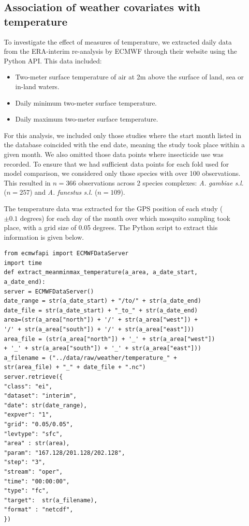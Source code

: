\documentclass[12pt]{article}
\begin{document}
{\subsection{Association of weather covariates with temperature}
To investigate the effect of measures of temperature, we extracted daily data from the ERA-interim re-analysis by ECMWF \citep{dee2011era} through their website using the Python API. This data included: 

\begin{itemize}
	\item Two-meter surface temperature of air at 2m above the surface of land, sea or in-land waters.
	\item Daily minimum two-meter surface temperature.
	\item Daily maximum two-meter surface temperature.
\end{itemize}

For this analysis, we included only those studies where the start month listed in the database coincided with the end date, meaning the study took place within a given month. We also omitted those data points where insecticide use was recorded. To ensure that we had sufficient data points for each fold used for model comparison, we considered only those species with over 100 observations. This resulted in $n=366$ observations across 2 species complexes: \textit{A. gambiae s.l.} ($n=257$) and \textit{A. funestus s.l.} ($n=109$).

The temperature data was extracted for the GPS position of each study ($\pm 0.1 \text{ degrees}$) for each day of the month over which mosquito sampling took place, with a grid size of 0.05 degrees. The Python script to extract this information is given below.

\begin{verbatim}
from ecmwfapi import ECMWFDataServer
import time
def extract_meanminmax_temperature(a_area, a_date_start,
a_date_end):
server = ECMWFDataServer()
date_range = str(a_date_start) + "/to/" + str(a_date_end)
date_file = str(a_date_start) + "_to_" + str(a_date_end)
area=(str(a_area["north"]) + '/' + str(a_area["west"]) +
'/' + str(a_area["south"]) + '/' + str(a_area["east"])) 
area_file = (str(a_area["north"]) + '_' + str(a_area["west"])
+ '_' + str(a_area["south"]) + '_' + str(a_area["east"]))
a_filename = ("../data/raw/weather/temperature_" +
str(area_file) + "_" + date_file + ".nc")
server.retrieve({
"class": "ei",
"dataset": "interim",
"date": str(date_range),
"expver": "1",
"grid": "0.05/0.05",
"levtype": "sfc",
"area" : str(area),
"param": "167.128/201.128/202.128",
"step": "3",
"stream": "oper",
"time": "00:00:00",
"type": "fc",
"target":  str(a_filename),
"format" : "netcdf",
})
\end{verbatim}

}
\end{document}
